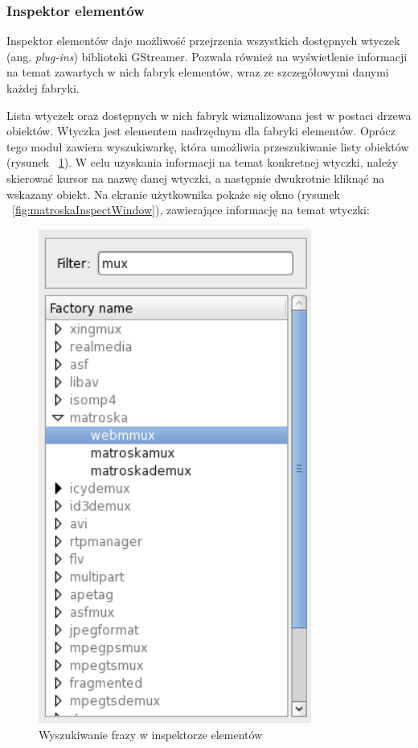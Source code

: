 \documentclass[12pt]{article}
\begin{document}
\subsubsection{Inspektor elementów}
Inspektor elementów daje możliwość przejrzenia wszystkich dostępnych wtyczek (ang. \textit{plug-ins}) biblioteki GStreamer. Pozwala również na wyświetlenie informacji na temat zawartych w nich fabryk elementów, wraz ze szczegółowymi danymi każdej fabryki. 
\begin{minipage}{0.55\textwidth}
Lista wtyczek oraz dostępnych w nich fabryk wizualizowana jest w postaci drzewa obiektów. Wtyczka jest elementem nadrzędnym dla fabryki elementów. Oprócz tego moduł zawiera wyszukiwarkę, która umożliwia przeszukiwanie listy obiektów (rysunek ~\ref{fig:elementInspector}).
W celu uzyskania informacji na temat konkretnej wtyczki, należy skierować kursor na nazwę danej wtyczki, a następnie dwukrotnie kliknąć na wskazany obiekt. Na ekranie użytkownika pokaże się okno (rysunek ~\ref{fig:matroskaInspectWindow}), zawierające informację na temat wtyczki:
\end{minipage}
\hfill
\begin{minipage}{0.35\textwidth}\raggedleft
\begin{figure}[H]
  \includegraphics[width=0.8\textwidth]{img/element-inspector.png}
  \caption{Wyszukiwanie frazy w inspektorze elementów}
  \label{fig:elementInspector}
\end{figure}
\end{minipage}
\end{document}
